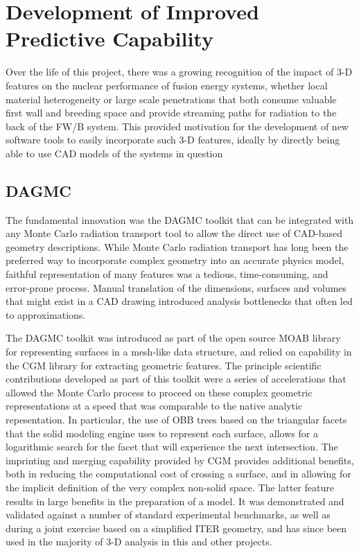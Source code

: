 \chapter{Development of Improved Predictive Capability}

Over the life of this project, there was a growing recognition of the impact
of 3-D features on the nuclear performance of fusion energy systems, whether
local material heterogeneity or large scale penetrations that both consume
valuable first wall and breeding space and provide streaming paths for
radiation to the back of the \gls{FW/B} system.  This provided motivation for
the development of new software tools to easily incorporate such 3-D features,
ideally by directly being able to use \gls{CAD} models of the systems in
question

\section{\acrlong{DAGMC}}

The fundamental innovation was the \gls{DAGMC} toolkit that can be integrated
with any Monte Carlo radiation transport tool to allow the direct use of
\gls{CAD}-based geometry descriptions.  While Monte Carlo radiation transport
has long been the preferred way to incorporate complex geometry into an
accurate physics model, faithful representation of many features was a
tedious, time-consuming, and error-prone process.  Manual translation of the
dimensions, surfaces and volumes that might exist in a \gls{CAD} drawing
introduced analysis bottlenecks that often led to approximations.

The \gls{DAGMC} toolkit was introduced as part of the
open source \gls{MOAB} library for representing surfaces in a
mesh-like data structure, and relied on capability in the
\gls{CGM} library for extracting geometric features.  The
principle scientific contributions developed as part of this toolkit were a
series of accelerations that allowed the Monte Carlo process to proceed on
these complex geometric representations at a speed that was comparable to the
native analytic repesentation.  In particular, the use of \gls{OBB} trees
based on the triangular facets that the solid modeling engine uses to
represent each surface, allows for a logarithmic search for the facet that
will experience the next intersection.  The imprinting and merging capability
provided by \gls{CGM} provides additional benefits, both in reducing the
computational cost of crossing a surface, and in allowing for the implicit
definition of the very complex non-solid space.  The latter feature results in
large benefits in the preparation of a model. It was
demonstrated and validated against a number of standard experimental
benchmarks, as well as during a joint exercise
based on a simplified ITER geometry, and has since
been used in the majority of 3-D analysis in this and other projects.

